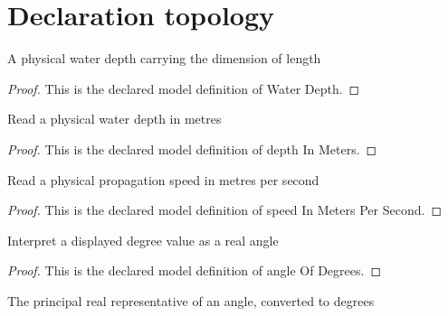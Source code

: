 \section{Declaration topology}
\begin{definition}
  \label{def:physics:phyx-mini-0174:phyxminiproblems-problemphyxmini0174-waterdepth}
  A physical water depth carrying the dimension of length
\end{definition}
\begin{proof}
  This is the declared model definition of Water Depth.
\end{proof}
\begin{definition}
  \label{def:physics:phyx-mini-0174:phyxminiproblems-problemphyxmini0174-depthinmeters}
  Read a physical water depth in metres
\end{definition}
\begin{proof}
  This is the declared model definition of depth In Meters.
\end{proof}
\begin{definition}
  \label{def:physics:phyx-mini-0174:phyxminiproblems-problemphyxmini0174-speedinmeterspersecond}
  Read a physical propagation speed in metres per second
\end{definition}
\begin{proof}
  This is the declared model definition of speed In Meters Per Second.
\end{proof}
\begin{definition}
  \label{def:physics:phyx-mini-0174:phyxminiproblems-problemphyxmini0174-angleofdegrees}
  Interpret a displayed degree value as a real angle
\end{definition}
\begin{proof}
  This is the declared model definition of angle Of Degrees.
\end{proof}
\begin{definition}
  \label{def:physics:phyx-mini-0174:phyxminiproblems-problemphyxmini0174-angleindegrees}
  The principal real representative of an angle, converted to degrees
\end{definition}
